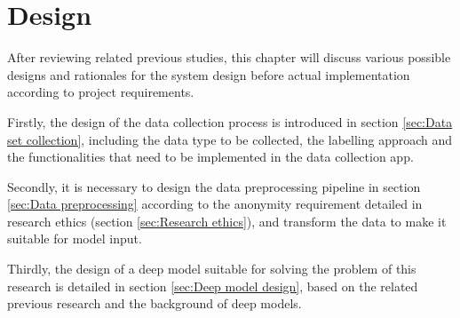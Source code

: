 \chapter{Design}
\label{chap:Design}
After reviewing related previous studies, this chapter will discuss various possible designs and rationales for the system design before actual implementation according to project requirements.

Firstly, the design of the data collection process is introduced in section \ref{sec:Data set collection}, including the data type to be collected, the labelling approach and the functionalities that need to be implemented in the data collection app.

Secondly, it is necessary to design the data preprocessing pipeline in section \ref{sec:Data preprocessing} according to the anonymity requirement detailed in research ethics (section \ref{sec:Research ethics}), and transform the data to make it suitable for model input.

Thirdly, the design of a deep model suitable for solving the problem of this research is detailed in section \ref{sec:Deep model design}, based on the related previous research and the background of deep models.

